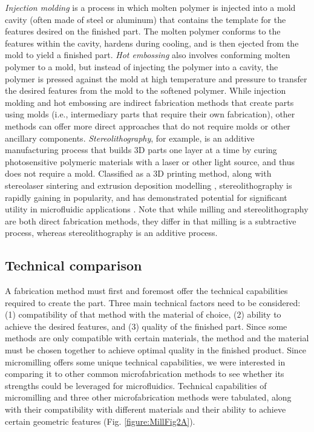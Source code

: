 \textit{Injection molding} is a process in which molten polymer is injected into a mold cavity (often made of steel or aluminum) that contains the template for the features desired on the finished part. The molten polymer conforms to the features within the cavity, hardens during cooling, and is then ejected from the mold to yield a finished part. \textit{Hot embossing} also involves conforming molten polymer to a mold, but instead of injecting the polymer into a cavity, the polymer is pressed against the mold at high temperature and pressure to transfer the desired features from the mold to the softened polymer. While injection molding and hot embossing are indirect fabrication methods that create parts using molds (i.e., intermediary parts that require their own fabrication), other methods can offer more direct approaches that do not require molds or other ancillary components. \textit{Stereolithography}, for example, is an additive manufacturing process that builds 3D parts one layer at a time by curing photosensitive polymeric materials with a laser or other light source, and thus does not require a mold. Classified as a 3D printing method, along with stereolaser sintering and extrusion deposition modelling \cite{Waldbaur2011}, stereolithography is rapidly gaining in popularity, and has demonstrated potential for significant utility in microfluidic applications \cite{Au2014,Morimoto2009, Bhargava2014}. Note that while milling and stereolithography are both direct fabrication methods, they differ in that milling is a subtractive process, whereas stereolithography is an additive process.

\subsection{Technical comparison}
A fabrication method must first and foremost offer the technical capabilities required to create the part. Three main technical factors need to be considered: (1) compatibility of that method with the material of choice, (2) ability to achieve the desired features, and (3) quality of the finished part. Since some methods are only compatible with certain materials, the method and the material must be chosen together to achieve optimal quality in the finished product. Since micromilling offers some unique technical capabilities, we were interested in comparing it to other common microfabrication methods to see whether its strengths could be leveraged for microfluidics. Technical capabilities of micromilling and three other microfabrication methods were tabulated, along with their compatibility with different materials and their ability to achieve certain geometric features (Fig. \ref{figure:MillFig2A}). 


